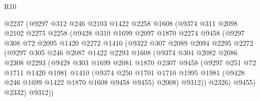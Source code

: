 \begin{lexlean}{R10}
\begin{coremodule}
                  @2237
                  (@9297
                    @312
                    @246
                    @2103
                    @1422
                    @2258
                    @1608
                    (@9374
                      @311
                      @2098
                      @2102
                      @2275
                      @2258
                      (@9428
                        @310
                        @1699
                        @2097
                        @1870
                        @2274
                        @9458
                        (@9297
                          @308
                          @72
                          @2095
                          @1420
                          @2272
                          @1410
                          (@9322
                            @307
                            @2089
                            @2094
                            @2295
                            @2272
                            (@9297
                              @305
                              @246
                              @2087
                              @1422
                              @2293
                              @1608
                              (@9374
                                @304
                                @2082
                                @2086
                                @2308
                                @2293
                                (@9428
                                  @303
                                  @1699
                                  @2081
                                  @1870
                                  @2307
                                  @9458
                                  (@9297
                                    @251
                                    @72
                                    @1711
                                    @1420
                                    @1981
                                    @1410
                                    (@9374
                                      @250
                                      @1701
                                      @1710
                                      @1995
                                      @1981
                                      (@9428 @246 @1699 @1422 @1870 @1608 @9458 @9455)
                                      @2008)
                                    @9312))
                                @2326)
                              @9455)
                            @2332)
                          @9312))

\end{coremodule}
\end{lexlean}

